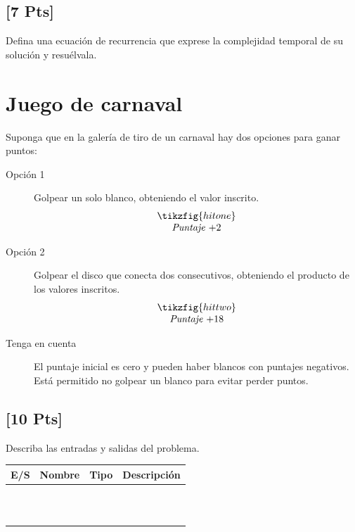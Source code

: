 \subsection{[7 Pts]} Defina una ecuación de recurrencia que exprese la complejidad
temporal de su solución y resuélvala.

\newpage
\section{Juego de carnaval}
Suponga que en la galería de tiro de un carnaval hay dos opciones para ganar puntos:
\begin{description}
	\item [Opción 1] Golpear un solo blanco, obteniendo el valor inscrito.
		\[
			\begin{array}{c}
				\tikzfig{hitone}\\
				\mbox{\emph{Puntaje $+2$}}
			\end{array}
		\]
		
	\item [Opción 2] Golpear el disco que conecta dos consecutivos, obteniendo
		el producto de los valores inscritos.
		\[
			\begin{array}{c}
				\tikzfig{hittwo}\\ 
				\mbox{\emph{Puntaje $+18$}}
			\end{array}
		\]
	\item [Tenga en cuenta] El puntaje inicial es cero y pueden haber blancos
		con puntajes negativos. Está permitido no golpear un blanco para
		evitar perder puntos.
\end{description}

\newpage
\subsection{[10 Pts]} Describa las entradas y salidas del problema.

\begin{tabular}{|| l| l| l| l||}
	\hline
	{\bf E/S} & {\bf Nombre} & {\bf Tipo} & {\bf Descripción}\\
	\hline
	        \hspace{1cm} & \hspace{3cm} & \hspace{2cm} & \hspace{4cm} \\
	          &          &          & \\
	          &          &          & \\
	          &          &          & \\
	          &          &          & \\
	          &          &          & \\
	          &          &          & \\
	          &          &          & \\
	          &          &          & \\
	          &          &          & \\
	          &          &          & \\
		  \hline
\end{tabular}

